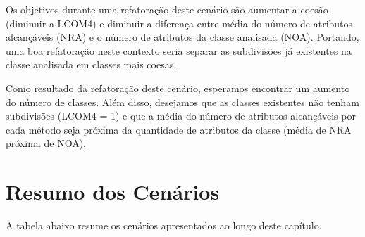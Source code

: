 Os objetivos durante uma refatoração deste cenário são aumentar a coesão (diminuir a LCOM4) e diminuir a diferença entre média do número de atributos alcançáveis (NRA) e o número de atributos da classe analisada (NOA). Portando, uma boa refatoração neste contexto seria separar as subdivisões já existentes na classe analisada em classes mais coesas.
	
Como resultado da refatoração deste cenário, esperamos encontrar um aumento do número de classes. Além disso, desejamos que as classes existentes não tenham subdivisões (LCOM4 = 1) e que a média do número de atributos alcançáveis por cada método seja próxima da quantidade de atributos da classe (média de NRA próxima de NOA).
                  
                
                           
\section{Resumo dos Cenários}

A tabela abaixo resume os cenários apresentados ao longo deste capítulo.

\newenvironment{my_table}
{\begin{list}{\labelitemi}
{  \setlength{\itemsep}{0pt}
  \setlength{\parskip}{0pt}
  \setlength{\parsep}{0pt}
  \setlength{\topsep}{0pt}
  \setlength{\partopsep}{0pt}
  \setlength{\leftmargin}{1em}
  \setlength{\rightmargin}{0.5em}
  \setlength{\topmargin}{0.5em}
}
}
{\end{list}}    

